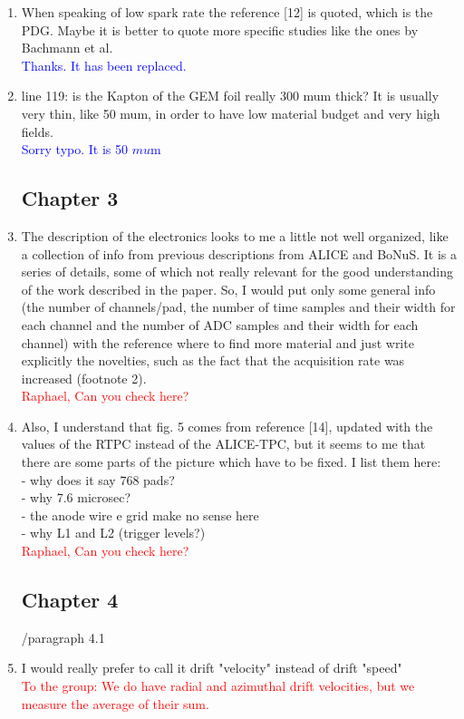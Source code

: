 \documentclass[a4paper,11pt,twoside]{article}
\begin{document}
\begin{enumerate}
\item When speaking of low spark rate the reference [12] is quoted, which is 
   the PDG. Maybe it is better to quote more specific studies like the ones by 
   Bachmann et al.\\
\textcolor{blue}{Thanks. It has been replaced.} 

\item line 119: is the Kapton of the GEM foil really 300 mum thick? It is 
   usually very thin, like 50 mum, in order to have low material budget and 
   very high fields.\\
\textcolor{blue}{Sorry typo. It is 50 $mu$m} 

\subsection*{ Chapter 3}
\item The description of the electronics looks to me a little not well 
   organized, like a collection of info from previous descriptions from ALICE 
   and BoNuS. It is a series of details, some of which not really relevant for 
   the good understanding of the work described in the paper. So, I would put 
   only some general info (the number of channels/pad, the number of time 
   samples and their width for each channel and the number of  ADC samples and 
   their width for each channel) with the reference where to find more material 
   and just write explicitly the novelties, such as the fact that the 
   acquisition rate was increased (footnote 2).\\
\textcolor{red}{Raphael, Can you check here?} 

\item Also, I understand that fig. 5 comes from reference [14], updated with 
   the values of the RTPC instead of the ALICE-TPC, but it seems to me that 
   there are some parts of the picture which have to be fixed. I list them 
   here:\\
- why does it say 768 pads?\\
- why 7.6 microsec?\\
- the anode wire e grid make no sense here\\
- why L1 and L2 (trigger levels?) \\
\textcolor{red}{Raphael, Can you check here? } 

\subsection*{ Chapter 4}
	/paragraph 4.1
\item I would really prefer to call it drift "velocity" instead of drift 
   "speed"\\
\textcolor{red}{To the group: We do have radial and azimuthal drift velocities, 
but we measure the average of their sum. } 


\end{enumerate}
\end{document}
